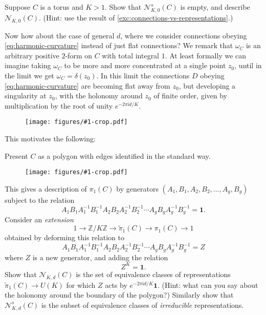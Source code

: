 \documentclass[12pt,letterpaper,reqno]{article}
\numberwithin{equation}{section}
\newcommand{\cN}{\ensuremath{\mathcal N}}
\newcommand{\Z}{\ensuremath{\mathbb Z}}
\newcommand{\I}{{\mathrm i}}
\newcommand\bid{{\mathbf 1}}
\newcommand{\ti}[1]{\textit{#1}}
\newcommand{\insfig}[2]{\begin{figure}[htbp] \centering \texttt{[image: figures/\#1-crop.pdf]} \label{fig:#1} \end{figure}}
\begin{document}
\begin{exercise} \label{exc:no-irreducible-connections-on-torus} 
Suppose $C$ is a torus 
and $K>1$. Show that $\cN_{K,0}^s(C)$ is empty, and describe $\cN_{K,0}(C)$.
(Hint: use the result
of \autoref{exc:connections-vs-representations}.)
\end{exercise}

Now how about the case of general $d$, where we consider
connections obeying \eqref{eq:harmonic-curvature} instead of
just flat connections?
We remark that $\omega_C$ is an arbitrary positive $2$-form 
on $C$ with total integral $1$.
At least formally we can imagine taking $\omega_C$ to be more and more 
concentrated at a single point $z_0$, until in the limit we get
$\omega_C = \delta(z_0)$. In this limit the connections $D$ obeying
\eqref{eq:harmonic-curvature} are becoming
flat away from $z_0$, but developing a singularity 
at $z_0$, with the holonomy around $z_0$
of finite order, given by multiplication by the root of unity 
$e^{-2 \pi \I d / K}$. 

\insfig{higgs-bundles-13}{0.95}

This motivates the following:
\begin{exercise} \label{exc:connections-vs-representations-general}
Present $C$ as a polygon with edges identified in the standard way.
\insfig{higgs-bundles-15}{1.1}
This gives a description of $\pi_1(C)$ by generators 
$(A_1, B_1, A_2, B_2, \dots, A_g, B_g)$ subject to the relation
\begin{equation}
	A_1 B_1 A_1^{-1} B_1^{-1} A_2 B_2 A_2^{-1} B_2^{-1} \cdots A_g B_g A_g^{-1} B_g^{-1} = \bid.
\end{equation}
Consider an \ti{extension}
\begin{equation}
	1 \to \Z / K\Z \to \tilde \pi_1(C) \to \pi_1(C) \to 1
\end{equation}
obtained by deforming this relation to
\begin{equation}
	A_1 B_1 A_1^{-1} B_1^{-1} A_2 B_2 A_2^{-1} B_2^{-1} \cdots A_g B_g A_g^{-1} B_g^{-1} = Z
\end{equation}
where $Z$ is a new generator, and adding the relation
\begin{equation}
	Z^K = \bid.
\end{equation}
Show that $\cN_{K,d}(C)$ is the set of equivalence classes
of representations $\tilde \pi_1(C) \to U(K)$ for which 
$Z$ acts by $e^{-2 \pi \I d / K} \bid$.
(Hint: what can you say about the
holonomy around the boundary of the polygon?)
Similarly show that $\cN^s_{K,d}(C)$ is the subset of equivalence
classes of \ti{irreducible} representations.
\end{exercise}
\end{document}
